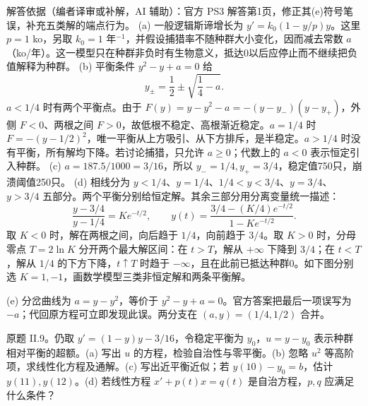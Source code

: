 \begin{solution}
解答依据（编者译审或补解，AI 辅助）：官方 PS3 解答第1页，修正其(e)符号笔误，补充五类解的端点行为。
(a) 一般逻辑斯谛增长为 $y'=k_0(1-y/p)y$。这里 $p=1$ ko，另取 $k_0=1$ 年$^{-1}$，并假设捕猎率不随种群大小变化，因而减去常数 $a$（ko/年）。这一模型只在种群非负时有生物意义，抵达0以后应停止而不继续把负值解释为种群。
(b) 平衡条件 $y^2-y+a=0$ 给
\[
 y_\pm=\frac12\pm\sqrt{\frac14-a}.
\]
$a<1/4$ 时有两个平衡点。由于 $F(y)=y-y^2-a=-(y-y_-)(y-y_+)$，外侧 $F<0$、两根之间 $F>0$，故低根不稳定、高根渐近稳定。$a=1/4$ 时 $F=-(y-1/2)^2$，唯一平衡从上方吸引、从下方排斥，是半稳定。$a>1/4$ 时没有平衡，所有解均下降。若讨论捕猎，只允许 $a\geq0$；代数上的 $a<0$ 表示恒定引入种群。
(c) $a=187.5/1000=3/16$，所以 $y_-=1/4,y_+=3/4$，稳定值750只，崩溃阈值250只。
(d) 相线分为 $y<1/4$、$y=1/4$、$1/4<y<3/4$、$y=3/4$、$y>3/4$ 五部分。两个平衡分别给恒定解。其余三部分用分离变量统一描述：
\[
 \frac{y-3/4}{y-1/4}=Ke^{-t/2},\qquad
 y(t)=\frac{3/4-(K/4)e^{-t/2}}{1-Ke^{-t/2}}.
\]
取 $K<0$ 时，解在两根之间，向后趋于 $1/4$，向前趋于 $3/4$。取 $K>0$ 时，分母零点 $T=2\ln K$ 分开两个最大解区间：在 $t>T$，解从 $+\infty$ 下降到 $3/4$；在 $t<T$，解从 $1/4$ 的下方下降，$t\uparrow T$ 时趋于 $-\infty$，且在此前已抵达种群0。如下图分别选 $K=1,-1$，画数学模型三类非恒定解和两条平衡解。
\begin{center}\end{center}
(e) 分岔曲线为 $a=y-y^2$，等价于 $y^2-y+a=0$。官方答案把最后一项误写为 $-a$；代回原方程可立即发现此误。两分支在 $(a,y)=(1/4,1/2)$ 合并。
\end{solution}
\begin{exercise}\label{cw:ps3-II-9}
原题 II.9。仍取 $y'=(1-y)y-3/16$，令稳定平衡为 $y_0$，$u=y-y_0$ 表示种群相对平衡的超额。(a) 写出 $u$ 的方程，检验自治性与零平衡。(b) 忽略 $u^2$ 等高阶项，求线性化方程及通解。(c) 写出近平衡近似；若 $y(10)-y_0=b$，估计 $y(11),y(12)$。(d) 若线性方程 $x'+p(t)x=q(t)$ 是自治方程，$p,q$ 应满足什么条件？
\end{exercise}
